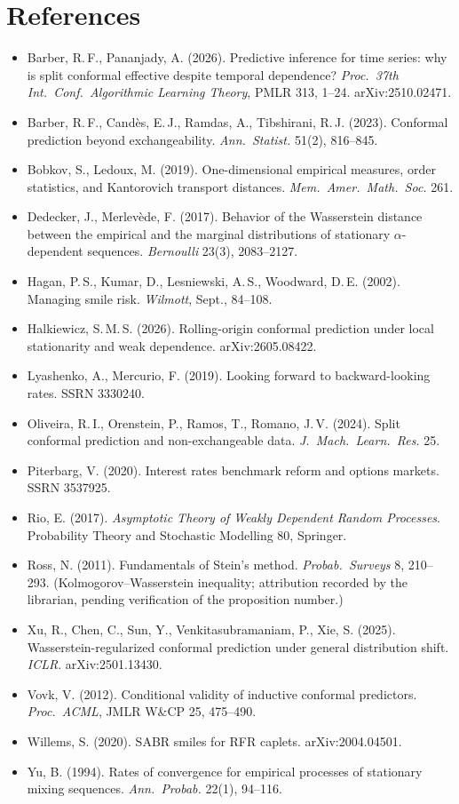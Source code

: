 \documentclass[11pt,a4paper]{article}
\theoremstyle{plain}
\theoremstyle{definition}
\theoremstyle{remark}
\begin{document}
\section*{References}
\small
\begin{itemize}[nosep,leftmargin=*]
\item Barber, R.\,F., Pananjady, A. (2026). Predictive inference for time series: why is split conformal effective despite temporal dependence? \emph{Proc.\ 37th Int.\ Conf.\ Algorithmic Learning Theory}, PMLR 313, 1--24. arXiv:2510.02471.
\item Barber, R.\,F., Cand\`es, E.\,J., Ramdas, A., Tibshirani, R.\,J. (2023). Conformal prediction beyond exchangeability. \emph{Ann.\ Statist.} 51(2), 816--845.
\item Bobkov, S., Ledoux, M. (2019). One-dimensional empirical measures, order statistics, and Kantorovich transport distances. \emph{Mem.\ Amer.\ Math.\ Soc.} 261.
\item Dedecker, J., Merlev\`ede, F. (2017). Behavior of the Wasserstein distance between the empirical and the marginal distributions of stationary $\alpha$-dependent sequences. \emph{Bernoulli} 23(3), 2083--2127.
\item Hagan, P.\,S., Kumar, D., Lesniewski, A.\,S., Woodward, D.\,E. (2002). Managing smile risk. \emph{Wilmott}, Sept., 84--108.
\item Halkiewicz, S.\,M.\,S. (2026). Rolling-origin conformal prediction under local stationarity and weak dependence. arXiv:2605.08422.
\item Lyashenko, A., Mercurio, F. (2019). Looking forward to backward-looking rates. SSRN 3330240.
\item Oliveira, R.\,I., Orenstein, P., Ramos, T., Romano, J.\,V. (2024). Split conformal prediction and non-exchangeable data. \emph{J.\ Mach.\ Learn.\ Res.} 25.
\item Piterbarg, V. (2020). Interest rates benchmark reform and options markets. SSRN 3537925.
\item Rio, E. (2017). \emph{Asymptotic Theory of Weakly Dependent Random Processes}. Probability Theory and Stochastic Modelling 80, Springer.
\item Ross, N. (2011). Fundamentals of Stein's method. \emph{Probab.\ Surveys} 8, 210--293. (Kolmogorov--Wasserstein inequality; attribution recorded by the librarian, pending verification of the proposition number.)
\item Xu, R., Chen, C., Sun, Y., Venkitasubramaniam, P., Xie, S. (2025). Wasserstein-regularized conformal prediction under general distribution shift. \emph{ICLR}. arXiv:2501.13430.
\item Vovk, V. (2012). Conditional validity of inductive conformal predictors. \emph{Proc.\ ACML}, JMLR W\&CP 25, 475--490.
\item Willems, S. (2020). SABR smiles for RFR caplets. arXiv:2004.04501.
\item Yu, B. (1994). Rates of convergence for empirical processes of stationary mixing sequences. \emph{Ann.\ Probab.} 22(1), 94--116.
\end{itemize}
\end{document}
